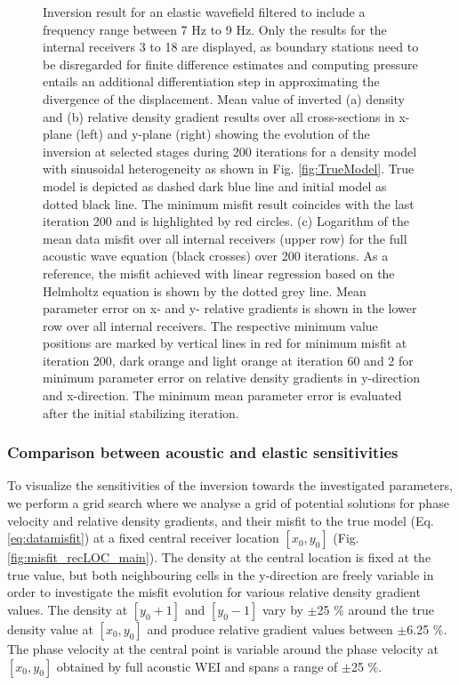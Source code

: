 \documentclass{article}
\begin{document}
\begin{figure}[H]
\begin{subfigure}[c]{0.65\linewidth}
		\end{subfigure}
		\caption{Inversion result for an elastic wavefield filtered to include a frequency range between 7 Hz to 9 Hz. Only the results for the internal receivers 3 to 18 are displayed, as boundary stations need to be disregarded for finite difference estimates and computing pressure entails an additional differentiation step in approximating the divergence of the displacement. Mean value of inverted (a) density and (b) relative density gradient results over all cross-sections in x-plane (left) and y-plane (right) showing the evolution of the inversion at selected stages during 200 iterations for a density model with sinusoidal heterogeneity as shown in Fig. \ref{fig:TrueModel}. True model is depicted as dashed dark blue line and initial model as dotted black line. The minimum misfit result coincides with the last iteration 200 and is highlighted by red circles. (c) Logarithm of the mean data misfit over all internal receivers (upper row) for the full acoustic wave equation (black crosses) over 200 iterations. As a reference, the misfit achieved with linear regression based on the Helmholtz equation is shown by the dotted grey line. Mean parameter error on x- and y- relative gradients is shown in the lower row over all internal receivers. The respective minimum value positions are marked by vertical lines in red for minimum misfit at iteration 200, dark orange and light orange at iteration 60 and 2 for minimum parameter error on relative density gradients in y-direction and x-direction. The minimum mean parameter error is evaluated after the initial stabilizing iteration. }
		\label{fig:el_results}
	\end{figure}
	 
	 \subsubsection{Comparison between acoustic and elastic sensitivities} \label{sec:sensitivities}
	 
	 To visualize the sensitivities of the inversion towards the investigated parameters, we perform a grid search where we analyse a grid of potential solutions for phase velocity and relative density gradients, and their misfit to the true model (Eq. \ref{eq:datamisfit}) at a fixed central receiver location $[x_{0},y_{0}]$ (Fig. \ref{fig:misfit_recLOC_main}). The density at the central location is fixed at the true value, but both neighbouring cells in the y-direction are freely variable in order to investigate the misfit evolution for various relative density gradient values. The density at $[y_{0}+1]$ and $[y_{0}-1]$ vary by $\pm$25 $\%$ around the true density value at $[x_{0},y_{0}]$ and produce relative gradient values between $\pm$6.25 $\%$. The phase velocity at the central point is variable around the phase velocity at $[x_{0},y_{0}]$ obtained by full acoustic WEI and spans a range of $\pm$25 $\%$. \\ %
	 
\end{document}
